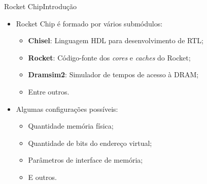 \documentclass[aspectratio=169, xcolor=dvipsnames]{beamer}
\let\olditem=\item%
\renewcommand{\item}{\olditem \justifying}
\begin{document}
\begin{frame}{Rocket Chip}{Introdução}
	\begin{itemize}
		\setlength{\itemsep}{1.5em}
		\item Rocket Chip é formado por vários submódulos:
		\begin{itemize}
			\setlength{\itemsep}{0.8em}
			\item \textbf{Chisel}: Linguagem HDL para desenvolvimento de RTL;
			\item \textbf{Rocket}: Código-fonte dos \textit{cores} e \textit{caches} do Rocket;
			\item \textbf{Dramsim2}: Simulador de tempos de acesso à DRAM; 
			\item Entre outros.
		\end{itemize}
	
		\item Algumas configurações possíveis:
		\begin{itemize}
			\setlength{\itemsep}{0.8em}
			\item Quantidade memória física;
			\item Quantidade de bits do endereço virtual;
			\item Parâmetros de interface de memória;
			\item E outros.
		\end{itemize}
	\end{itemize}
\end{frame}
\end{document}
